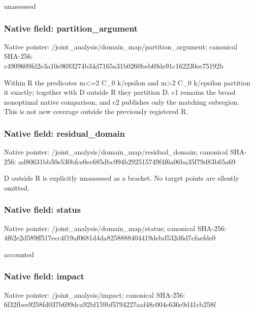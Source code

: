 \documentclass[10pt,a4paper]{article}
\begin{document}
\begingroup\raggedright\sloppy unassessed\par\endgroup

\subsubsection{Native field: partition\_\allowbreak{}argument}
Native pointer: /joint\_\allowbreak{}analysis/domain\_\allowbreak{}map/partition\_\allowbreak{}argument; canonical SHA-256: c4909609fd2e3a10e9693274b34d7165a31b0260beb69de91c162230ee75192b

\begingroup\raggedright\sloppy Within R the predicates m<=\allowbreak{}2 C\_\allowbreak{}0 k/\allowbreak{}epsilon and m>2 C\_\allowbreak{}0 k/\allowbreak{}epsilon partition it exactly;\allowbreak{} together with D outside R they partition D. c1 remains the broad nonoptimal native comparison,\allowbreak{} and c2 publishes only the matching subregion. This is not new coverage outside the previously registered R.\par\endgroup

\subsubsection{Native field: residual\_\allowbreak{}domain}
Native pointer: /joint\_\allowbreak{}analysis/domain\_\allowbreak{}map/residual\_\allowbreak{}domain; canonical SHA-256: ad80631bb50e530bfce0ec685dbc994b292515749f4f6a06ba35f79d83b65a69

\begingroup\raggedright\sloppy D outside R is explicitly unassessed as a bracket. No target points are silently omitted.\par\endgroup

\subsubsection{Native field: status}
Native pointer: /joint\_\allowbreak{}analysis/domain\_\allowbreak{}map/status; canonical SHA-256: 4f62e2d589ff517ecc4f19af0681d4da8258888404419debd532d6d7cfaefde0

\begingroup\raggedright\sloppy accounted\par\endgroup

\subsubsection{Native field: impact}
Native pointer: /joint\_\allowbreak{}analysis/impact; canonical SHA-256: 6f32fbee9258fd037b699dca92bf159bf5794227aaf48c004c636e9d41cb258f
\end{document}
